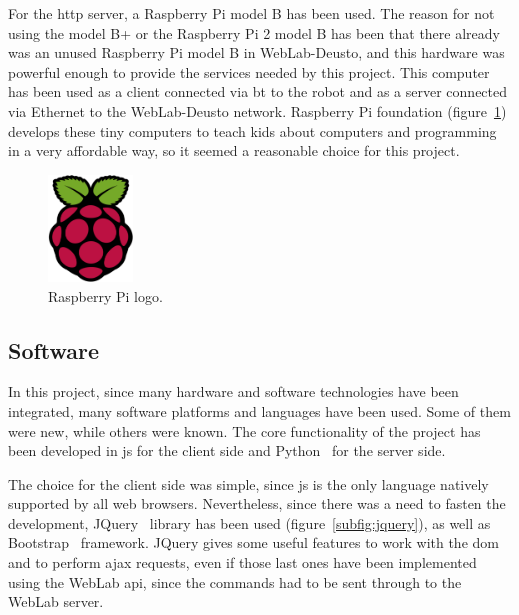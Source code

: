 For the \acrshort{http} server, a Raspberry Pi model B has been used. The reason for not using the
model B+ or the Raspberry Pi 2 model B has been that there already was an unused Raspberry Pi model
B in WebLab-Deusto, and this hardware was powerful enough to provide the services needed by this
project. This computer has been used as a client connected via \acrlong{bt} to the robot and as a
server connected via Ethernet to the WebLab-Deusto network. Raspberry Pi foundation
(figure~\ref{fig:rasp_logo}) develops these tiny computers to teach kids about computers and
programming in a very affordable way, so it seemed a reasonable choice for this project.

\begin{figure}[!htbp]
	\centering
	\includegraphics[width=0.2\textwidth]{fig/rasp-logo}
	\caption{Raspberry Pi logo.}
	\label{fig:rasp_logo}
\end{figure}

\subsection{Software}

In this project, since many hardware and software technologies have been integrated, many software
platforms and languages have been used. Some of them were new, while others were known. The core
functionality of the project has been developed in \acrlong{js} for the client side and
Python~\cite{python_web} for the server side.

The choice for the client side was simple, since \acrlong{js} is the only language natively
supported by all web browsers. Nevertheless, since there was a need to fasten the development,
JQuery~\cite{jquery_web} library has been used (figure~\ref{subfig:jquery}), as well as
Bootstrap~\cite{bootstrap_web} framework. JQuery gives some useful features to work with the
\acrshort{dom} and to perform \acrshort{ajax} requests, even if those last ones have been
implemented using the WebLab \acrshort{api}, since the commands had to be sent through to the WebLab
server.

